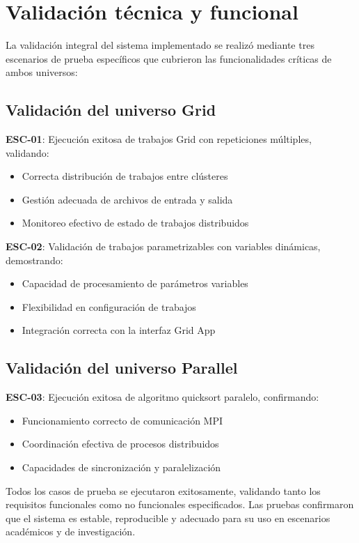 \section{Validación técnica y funcional}
\noindent

La validación integral del sistema implementado se realizó mediante tres escenarios de prueba específicos que cubrieron las funcionalidades críticas de ambos universos:

\subsection{Validación del universo Grid}
\noindent

\textbf{ESC-01}: Ejecución exitosa de trabajos Grid con repeticiones múltiples, validando:
\begin{itemize}
    \item Correcta distribución de trabajos entre clústeres
    \item Gestión adecuada de archivos de entrada y salida
    \item Monitoreo efectivo de estado de trabajos distribuidos
\end{itemize}

\textbf{ESC-02}: Validación de trabajos parametrizables con variables dinámicas, demostrando:
\begin{itemize}
    \item Capacidad de procesamiento de parámetros variables
    \item Flexibilidad en configuración de trabajos
    \item Integración correcta con la interfaz Grid App
\end{itemize}

\subsection{Validación del universo Parallel}
\noindent

\textbf{ESC-03}: Ejecución exitosa de algoritmo quicksort paralelo, confirmando:
\begin{itemize}
    \item Funcionamiento correcto de comunicación MPI
    \item Coordinación efectiva de procesos distribuidos
    \item Capacidades de sincronización y paralelización
\end{itemize}

Todos los casos de prueba se ejecutaron exitosamente, validando tanto los requisitos funcionales como no funcionales especificados. Las pruebas confirmaron que el sistema es estable, reproducible y adecuado para su uso en escenarios académicos y de investigación.

